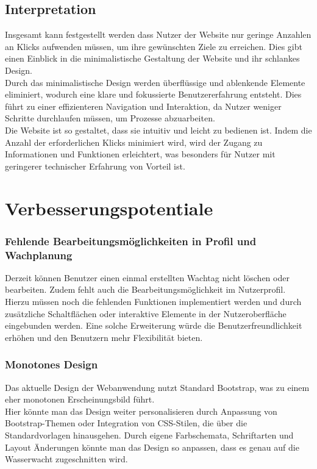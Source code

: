 \documentclass[fontsize=12pt,openright,oneside,paper=a4,BCOR=1cm]{scrbook}
\begin{document}
\subsection{Interpretation}
Insgesamt kann festgestellt werden dass Nutzer der Website nur geringe Anzahlen an Klicks aufwenden müssen, um ihre gewünschten Ziele zu erreichen. Dies gibt einen Einblick in die minimalistische Gestaltung der Website und ihr schlankes Design. \\ 
Durch das minimalistische Design werden überflüssige und ablenkende Elemente eliminiert, wodurch eine klare und fokussierte Benutzererfahrung entsteht. Dies führt zu einer effizienteren Navigation und Interaktion, da Nutzer weniger Schritte durchlaufen müssen, um Prozesse abzuarbeiten. \\
Die Website ist so gestaltet, dass sie intuitiv und leicht zu bedienen ist. Indem die Anzahl der erforderlichen Klicks minimiert wird, wird der Zugang zu Informationen und Funktionen erleichtert, was besonders für Nutzer mit geringerer technischer Erfahrung von Vorteil ist. 


\section{Verbesserungspotentiale}

\subsubsection{Fehlende Bearbeitungsmöglichkeiten in Profil und Wachplanung}
Derzeit können Benutzer einen einmal erstellten Wachtag nicht löschen oder bearbeiten. Zudem fehlt auch die Bearbeitungsmöglichkeit im Nutzerprofil. \\ 
Hierzu müssen noch die fehlenden Funktionen implementiert werden und durch zusätzliche Schaltflächen oder interaktive Elemente in der Nutzeroberfläche eingebunden werden. Eine solche Erweiterung würde die Benutzerfreundlichkeit erhöhen und den Benutzern mehr Flexibilität bieten.

\subsubsection{Monotones Design} 
Das aktuelle Design der Webanwendung nutzt Standard Bootstrap, was zu einem eher monotonen Erscheinungsbild führt. \\ 
Hier könnte man das Design weiter personalisieren durch Anpassung von Bootstrap-Themen oder Integration von CSS-Stilen, die über die Standardvorlagen hinausgehen. Durch eigene Farbschemata, Schriftarten und Layout Änderungen könnte man das Design so anpassen, dass es genau auf die Wasserwacht zugeschnitten wird.
\end{document}
